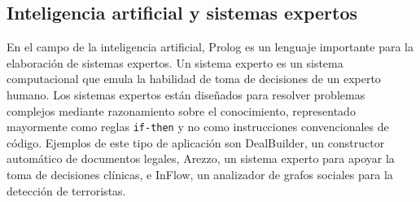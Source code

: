 \documentclass[11pt,captions=nooneline,DIV=14, parskip=full]{scrartcl}
\begin{document}
\subsection{Inteligencia artificial y sistemas expertos}
En el campo de la inteligencia artificial, Prolog es un lenguaje importante para la elaboración de sistemas expertos. Un sistema experto es un sistema computacional que emula la habilidad de toma de decisiones de un experto humano. Los sistemas expertos están diseñados para resolver problemas complejos mediante razonamiento sobre el conocimiento, representado mayormente como reglas \texttt{if-then} y no como instrucciones convencionales de código. Ejemplos de este tipo de aplicación son DealBuilder, un constructor automático de documentos legales, Arezzo, un sistema experto para apoyar la toma de decisiones clínicas, e InFlow, un analizador de grafos sociales para la detección de terroristas.
\end{document}
